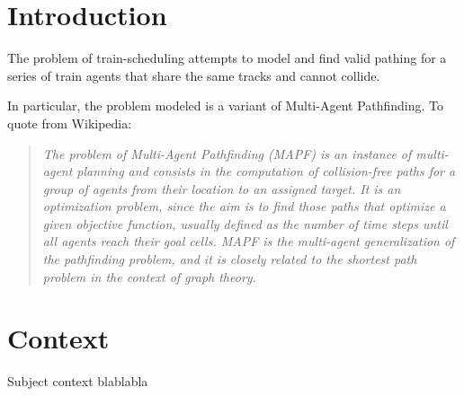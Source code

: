 \section{Introduction}
The problem of train-scheduling attempts to model and find valid pathing for a series of train agents that share the same tracks and cannot collide. 

In particular, the problem modeled is a variant of Multi-Agent Pathfinding. To quote from Wikipedia:
\begin{quote}
\emph{The problem of Multi-Agent Pathfinding (MAPF) is an instance of multi-agent planning and consists in the computation of collision-free paths for a group of agents from their location to an assigned target. It is an optimization problem, since the aim is to find those paths that optimize a given objective function, usually defined as the number of time steps until all agents reach their goal cells. MAPF is the multi-agent generalization of the pathfinding problem, and it is closely related to the shortest path problem in the context of graph theory.}
\end{quote}


\section{Context}

Subject context blablabla


